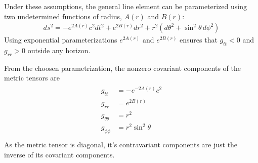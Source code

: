 \documentclass[letterpaper,10pt,english]{jupyterBook}
\begin{document}
\sphinxAtStartPar
Under these assumptions, the general line element can be parameterized using two undetermined functions of radius, \(A(r)\) and \(B(r)\):
\begin{equation*}
\begin{split}ds^2 = -e^{2A(r)} c^2 dt^2 + e^{2B(r)} dr^2 + r^2 \left( d \theta^2 + \sin^2 \theta \, d\phi^2 \right)\end{split}
\end{equation*}
\sphinxAtStartPar
{} Using exponential parameterizations \(e^{2A(r)}\) and \(e^{2B(r)}\) ensures that \(g_{tt} < 0\) and \(g_{rr} > 0\) outside any horizon.  

\sphinxAtStartPar
From the choosen parametrization, the non\sphinxhyphen{}zero covariant components of the metric tensors are
\begin{equation*}
\begin{split}\begin{aligned}
  g_{tt} & = - e^{- 2 A(r)} c^2 \\
  g_{rr} & =   e^{  2 B(r)}     \\
  g_{\theta \theta} & = r^2    \\
  g_{\phi \phi} & =  r^2 \sin^2 \theta     \\
\end{aligned}\end{split}
\end{equation*}
\sphinxAtStartPar
As the metric tensor is diagonal, it’s contravariant components are just the inverse of its covariant components.
\end{document}
